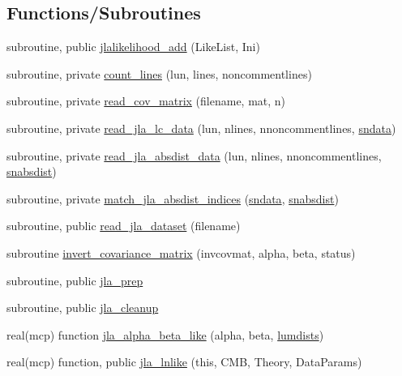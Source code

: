 \subsection*{Functions/\+Subroutines}
\begin{DoxyCompactItemize}
\item 
subroutine, public \mbox{\hyperlink{namespacejla_a76279ec95aebe74a01796fb5d2734d94}{jlalikelihood\+\_\+add}} (Like\+List, Ini)
\item 
subroutine, private \mbox{\hyperlink{namespacejla_a2b7997e55b705956940cd1729f2a6e93}{count\+\_\+lines}} (lun, lines, noncommentlines)
\item 
subroutine, private \mbox{\hyperlink{namespacejla_ae2ea921f1a8597682a71a793dc11bbe7}{read\+\_\+cov\+\_\+matrix}} (filename, mat, n)
\item 
subroutine, private \mbox{\hyperlink{namespacejla_aadb5af8cc4301188cd29adc8b94a5bb0}{read\+\_\+jla\+\_\+lc\+\_\+data}} (lun, nlines, nnoncommentlines, \mbox{\hyperlink{namespacejla_a9e2b90e3f1e2fbd40d61e0ad31bb2684}{sndata}})
\item 
subroutine, private \mbox{\hyperlink{namespacejla_ad1ad5e96f9f9f225249edadd8b348012}{read\+\_\+jla\+\_\+absdist\+\_\+data}} (lun, nlines, nnoncommentlines, \mbox{\hyperlink{namespacejla_ac714ae18a12d4b4a726b05c017fd1e92}{snabsdist}})
\item 
subroutine, private \mbox{\hyperlink{namespacejla_af2e3afa13e8cf5731d6cf06c1ddaf31a}{match\+\_\+jla\+\_\+absdist\+\_\+indices}} (\mbox{\hyperlink{namespacejla_a9e2b90e3f1e2fbd40d61e0ad31bb2684}{sndata}}, \mbox{\hyperlink{namespacejla_ac714ae18a12d4b4a726b05c017fd1e92}{snabsdist}})
\item 
subroutine, public \mbox{\hyperlink{namespacejla_a3a08d66a30f511b1a63b006b9c1fac53}{read\+\_\+jla\+\_\+dataset}} (filename)
\item 
subroutine \mbox{\hyperlink{namespacejla_a212c8dceda3061fd0e44c6a2834a4196}{invert\+\_\+covariance\+\_\+matrix}} (invcovmat, alpha, beta, status)
\item 
subroutine, public \mbox{\hyperlink{namespacejla_a840bbaee909bef635242328944cb1a14}{jla\+\_\+prep}}
\item 
subroutine, public \mbox{\hyperlink{namespacejla_abe626bf6278990fc57f73440426b3740}{jla\+\_\+cleanup}}
\item 
real(mcp) function \mbox{\hyperlink{namespacejla_aaf4f263910da5f17d55cd63613847567}{jla\+\_\+alpha\+\_\+beta\+\_\+like}} (alpha, beta, \mbox{\hyperlink{namespacejla_a488389e4c0ef651c499c3c48d6bee7ef}{lumdists}})
\item 
real(mcp) function, public \mbox{\hyperlink{namespacejla_a9a536b5f47c5314d3099af7ca66ec027}{jla\+\_\+lnlike}} (this, C\+MB, Theory, Data\+Params)
\end{DoxyCompactItemize}
